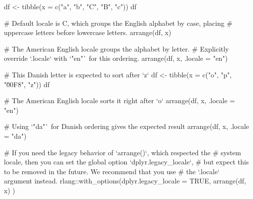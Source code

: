 \documentclass[a4paper]{book}
\begin{document}
%
\begin{Examples}
\begin{ExampleCode}

df <- tibble(x = c("a", "b", "C", "B", "c"))
df

# Default locale is C, which groups the English alphabet by case, placing
# uppercase letters before lowercase letters.
arrange(df, x)

# The American English locale groups the alphabet by letter.
# Explicitly override `.locale` with `"en"` for this ordering.
arrange(df, x, .locale = "en")

# This Danish letter is expected to sort after `z`
df <- tibble(x = c("o", "p", "\u00F8", "z"))
df

# The American English locale sorts it right after `o`
arrange(df, x, .locale = "en")

# Using `"da"` for Danish ordering gives the expected result
arrange(df, x, .locale = "da")

# If you need the legacy behavior of `arrange()`, which respected the
# system locale, then you can set the global option `dplyr.legacy_locale`,
# but expect this to be removed in the future. We recommend that you use
# the `.locale` argument instead.
rlang::with_options(dplyr.legacy_locale = TRUE, {
  arrange(df, x)
})

\end{ExampleCode}
\end{Examples}
%
\end{document}
